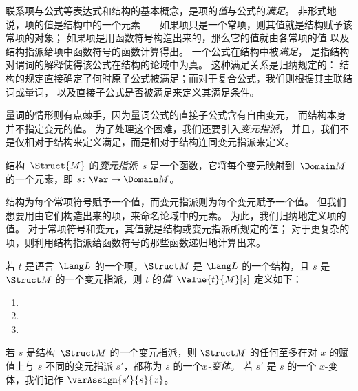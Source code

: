 \documentclass[../../../include/open-logic-section]{subfiles}
\begin{document}


\begin{explain}
联系项与公式等表达式和结构的基本概念，是项的\emph{值}与公式的\emph{满足}。
非形式地说，项的值是结构中的一个元素——如果项只是一个常项，则其值就是结构赋予该常项的对象；
如果项是用函数符号构造出来的，那么它的值就由各常项的值
以及结构指派给项中函数符号的函数计算得出。
一个公式在结构中被\emph{满足}，
是指结构对谓词的解释使得该公式在结构的论域中为真。
这种满足关系是归纳规定的：
结构的规定直接确定了何时原子公式被满足；而对于复合公式，我们则根据其主联结词或量词，
以及直接子公式是否被满足来定义其满足条件。

量词的情形则有点棘手，因为量词公式的直接子公式含有自由变元，
而结构本身并不指定变元的值。
为了处理这个困难，我们还要引入\emph{变元指派}，
并且，我们不是仅相对于结构来定义满足，而是相对于结构连同变元指派来定义。
\end{explain}

\begin{defn}[变元指派]
结构~$\Struct{M}$ 的\emph{变元指派}~$s$ 是一个函数，它将每个变元映射到~$\Domain M$ 的一个元素，即 $s\colon \Var \to \Domain M$。
\end{defn}

\begin{explain}
结构为每个常项符号赋予一个值，而变元指派则为每个变元赋予一个值。
但我们想要用由它们构造出来的项，来命名论域中的元素。
为此，我们归纳地定义项的值。
对于常项符号和变元，其值就是结构或变元指派所规定的值；
对于更复杂的项，则利用结构指派给函数符号的那些函数递归地计算出来。
\end{explain}

\begin{defn}[项的值]
若 $t$ 是语言~$\Lang L$ 的一个项，$\Struct M$ 是 $\Lang L$ 的一个结构，且 $s$ 是 $\Struct M$ 的一个变元指派，则 $t$ 的\emph{值}~$\Value{t}{M}[s]$ 定义如下：
\begin{enumerate}
\item {}
\item {}
\item {}
\end{enumerate}
\end{defn}

\begin{defn}[$x$-变体]
若 $s$ 是结构~$\Struct M$ 的一个变元指派，则 $\Struct M$ 的任何至多在对 $x$ 的赋值上与 $s$ 不同的变元指派 $s'$，都称为 $s$ 的一个\emph{$x$-变体}。
若 $s'$ 是 $s$ 的一个 $x$-变体，我们记作 $\varAssign{s'}{s}{x}$。
\end{defn}
\end{document}
